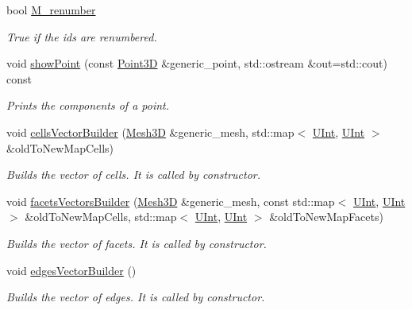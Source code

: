 \begin{DoxyCompactItemize}
bool \hyperlink{classFVCode3D_1_1Rigid__Mesh_a3d9468c34407de926f494d4aa47af64f}{M\+\_\+renumber}
\begin{DoxyCompactList}\small\item\em True if the ids are renumbered. \end{DoxyCompactList}\item 
void \hyperlink{classFVCode3D_1_1Rigid__Mesh_a3bbdb25ce1eddaf66316487bfc05e089}{show\+Point} (const \hyperlink{classFVCode3D_1_1Point3D}{Point3D} \&generic\+\_\+point, std\+::ostream \&out=std\+::cout) const 
\begin{DoxyCompactList}\small\item\em Prints the components of a point. \end{DoxyCompactList}\item 
void \hyperlink{classFVCode3D_1_1Rigid__Mesh_a3ddbd3589db60840edbbd76d4a69ec0a}{cells\+Vector\+Builder} (\hyperlink{classFVCode3D_1_1Mesh3D}{Mesh3D} \&generic\+\_\+mesh, std\+::map$<$ \hyperlink{namespaceFVCode3D_a4bf7e328c75d0fd504050d040ebe9eda}{U\+Int}, \hyperlink{namespaceFVCode3D_a4bf7e328c75d0fd504050d040ebe9eda}{U\+Int} $>$ \&old\+To\+New\+Map\+Cells)
\begin{DoxyCompactList}\small\item\em Builds the vector of cells. It is called by constructor. \end{DoxyCompactList}\item 
void \hyperlink{classFVCode3D_1_1Rigid__Mesh_aa425c5b71169c77ee04ad9fe3ebf9123}{facets\+Vectors\+Builder} (\hyperlink{classFVCode3D_1_1Mesh3D}{Mesh3D} \&generic\+\_\+mesh, const std\+::map$<$ \hyperlink{namespaceFVCode3D_a4bf7e328c75d0fd504050d040ebe9eda}{U\+Int}, \hyperlink{namespaceFVCode3D_a4bf7e328c75d0fd504050d040ebe9eda}{U\+Int} $>$ \&old\+To\+New\+Map\+Cells, std\+::map$<$ \hyperlink{namespaceFVCode3D_a4bf7e328c75d0fd504050d040ebe9eda}{U\+Int}, \hyperlink{namespaceFVCode3D_a4bf7e328c75d0fd504050d040ebe9eda}{U\+Int} $>$ \&old\+To\+New\+Map\+Facets)
\begin{DoxyCompactList}\small\item\em Builds the vector of facets. It is called by constructor. \end{DoxyCompactList}\item 
void \hyperlink{classFVCode3D_1_1Rigid__Mesh_ac06b1206bf25e6045a2b361b5e7508f4}{edges\+Vector\+Builder} ()
\begin{DoxyCompactList}\small\item\em Builds the vector of edges. It is called by constructor. \end{DoxyCompactList}\item 

\end{DoxyCompactItemize}
